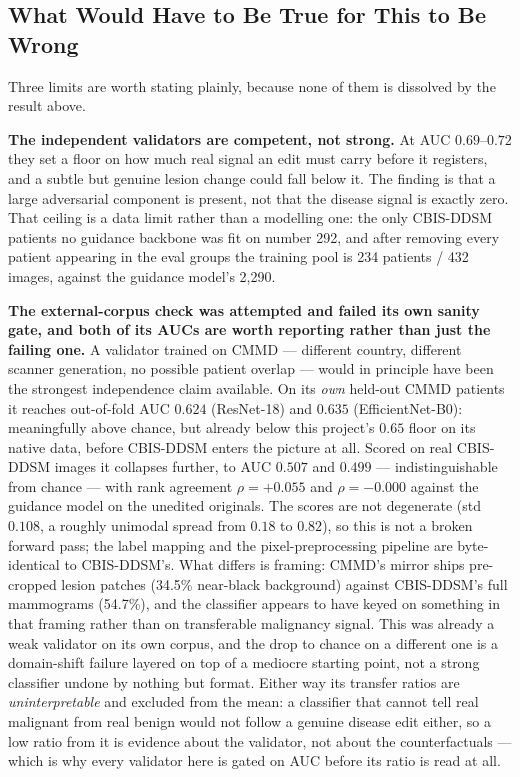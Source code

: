 \subsection{What Would Have to Be True for This to Be Wrong}

Three limits are worth stating plainly, because none of them is dissolved by
the result above.

\textbf{The independent validators are competent, not strong.} At AUC
$0.69$--$0.72$ they set a floor on how much real signal an edit must carry
before it registers, and a subtle but genuine lesion change could fall below
it. The finding is that a large adversarial component is present, not that
the disease signal is exactly zero. That ceiling is a data limit rather than
a modelling one: the only CBIS-DDSM patients no guidance backbone was fit on
number 292, and after removing every patient appearing in the eval groups the
training pool is 234 patients / 432 images, against the guidance model's
2{,}290.

\textbf{The external-corpus check was attempted and failed its own sanity
gate, and both of its AUCs are worth reporting rather than just the failing
one.} A validator trained on CMMD --- different country, different scanner
generation, no possible patient overlap --- would in principle have been the
strongest independence claim available. On its \emph{own} held-out CMMD
patients it reaches out-of-fold AUC $0.624$ (ResNet-18) and $0.635$
(EfficientNet-B0): meaningfully above chance, but already below this
project's $0.65$ floor on its native data, before CBIS-DDSM enters the
picture at all. Scored on real CBIS-DDSM images it collapses further, to
AUC $0.507$ and $0.499$ --- indistinguishable from chance --- with rank
agreement $\rho = +0.055$ and $\rho = -0.000$ against the guidance model on
the unedited originals. The scores are not degenerate (std $0.108$, a
roughly unimodal spread from $0.18$ to $0.82$), so this is not a broken
forward pass; the label mapping and the pixel-preprocessing pipeline are
byte-identical to CBIS-DDSM's. What differs is framing: CMMD's mirror ships
pre-cropped lesion patches (34.5\% near-black background) against
CBIS-DDSM's full mammograms (54.7\%), and the classifier appears to have
keyed on something in that framing rather than on transferable malignancy
signal. This was already a weak validator on its own corpus, and the drop
to chance on a different one is a domain-shift failure layered on top of a
mediocre starting point, not a strong classifier undone by nothing but
format. Either way its transfer ratios are \emph{uninterpretable} and
excluded from the mean: a classifier that cannot tell real malignant from
real benign would not follow a genuine disease edit either, so a low ratio
from it is evidence about the validator, not about the counterfactuals ---
which is why every validator here is gated on AUC before its ratio is
read at all.

